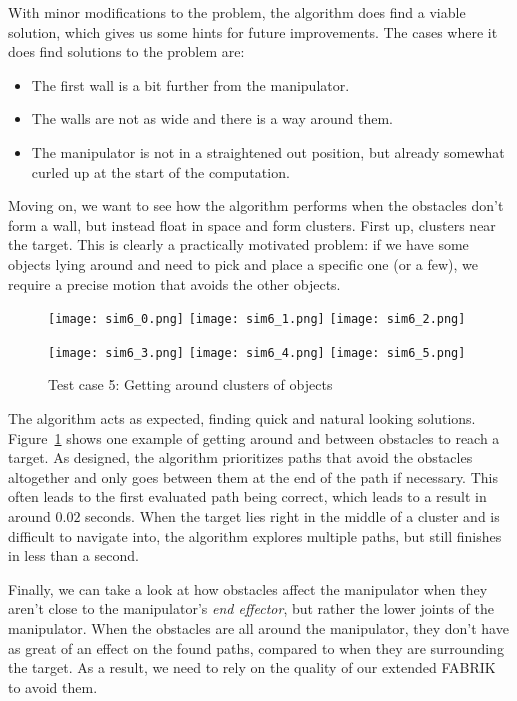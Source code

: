 With minor modifications to the problem, the algorithm does find a viable solution, which gives us some hints for future improvements. The cases where it does find solutions to the problem are:

\begin{itemize}
\item The first wall is a bit further from the manipulator.
\item The walls are not as wide and there is a way around them.
\item The manipulator is not in a straightened out position, but already somewhat curled up at the start of the computation.
\end{itemize}

Moving on, we want to see how the algorithm performs when the obstacles don't form a wall, but instead float in space and form clusters. First up, clusters near the target. This is clearly a practically motivated problem: if we have some objects lying around and need to pick and place a specific one (or a few), we require a precise motion that avoids the other objects.

\begin{figure}[h]
  \centering
  \begin{minipage}{\textwidth}
    \texttt{[image: sim6\_0.png]}
    \texttt{[image: sim6\_1.png]}
    \texttt{[image: sim6\_2.png]}

    \texttt{[image: sim6\_3.png]}
    \texttt{[image: sim6\_4.png]}
    \texttt{[image: sim6\_5.png]}
  \end{minipage}
  \caption{Test case 5: Getting around clusters of objects}\label{fig:sim6}
\end{figure}

The algorithm acts as expected, finding quick and natural looking solutions. Figure~\ref{fig:sim6} shows one example of getting around and between obstacles to reach a target. As designed, the algorithm prioritizes paths that avoid the obstacles altogether and only goes between them at the end of the path if necessary. This often leads to the first evaluated path being correct, which leads to a result in around $0.02$ seconds. When the target lies right in the middle of a cluster and is difficult to navigate into, the algorithm explores multiple paths, but still finishes in less than a second.

Finally, we can take a look at how obstacles affect the manipulator when they aren't close to the manipulator's \textit{end effector}, but rather the lower joints of the manipulator. When the obstacles are all around the manipulator, they don't have as great of an effect on the found paths, compared to when they are surrounding the target. As a result, we need to rely on the quality of our extended FABRIK to avoid them.

